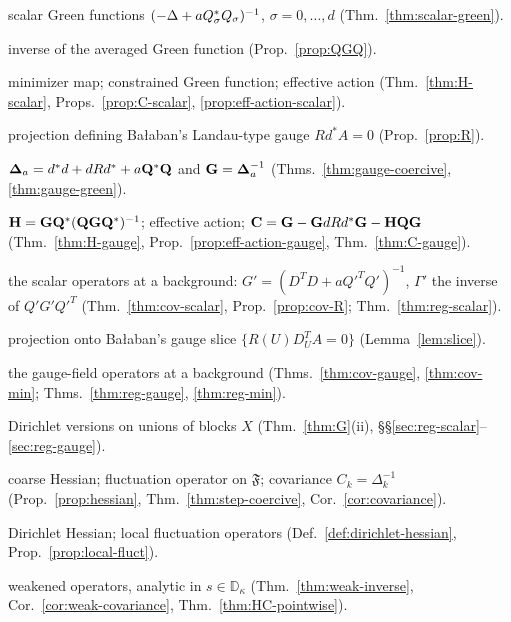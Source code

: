 {\small
\begin{description}[font=\normalfont,style=nextline,leftmargin=10em,labelwidth=9.5em,labelsep=0.5em,itemsep=1pt,parsep=0pt,topsep=4pt]
\item[$G_\sigma$] scalar Green functions $(-\Delta+aQ_\sigma^*Q_\sigma)^{-1}$, $\sigma=0,\dots,d$ (Thm.~\ref{thm:scalar-green}).
\item[$(Q_\sigma G_\sigma Q_\sigma^*)^{-1}$] inverse of the averaged Green function (Prop.~\ref{prop:QGQ}).
\item[$H_\sigma$, $C_\sigma$, $\cD_\sigma$] minimizer map; constrained Green function; effective action (Thm.~\ref{thm:H-scalar}, Props.~\ref{prop:C-scalar}, \ref{prop:eff-action-scalar}).
\item[$R=I-P_\cV$] projection defining Ba\l aban's Landau-type gauge $Rd^*A=0$ (Prop.~\ref{prop:R}).
\item[$\bL_a$, $\bG$] $\boldsymbol{\Delta}_a=d^*d+dRd^*+a\mathbf Q^*\mathbf Q$ and $\mathbf G=\boldsymbol{\Delta}_a^{-1}$ (Thms.~\ref{thm:gauge-coercive}, \ref{thm:gauge-green}).
\item[$\bH$, $\bD$, $\bC$] $\mathbf H=\mathbf G\mathbf Q^*(\mathbf Q\mathbf G\mathbf Q^*)^{-1}$; effective action; $\mathbf C=\mathbf G-\mathbf G dRd^*\mathbf G-\mathbf H\mathbf Q\mathbf G$ (Thm.~\ref{thm:H-gauge}, Prop.~\ref{prop:eff-action-gauge}, Thm.~\ref{thm:C-gauge}).
\item[$G'(U)$, $\Gamma'(U)$, $H'(U)$, $C'(U)$, $R(U)$] the scalar operators at a background: $G'=(D^TD+aQ'^TQ')^{-1}$, $\Gamma'$ the inverse of $Q'G'Q'^T$ (Thm.~\ref{thm:cov-scalar}, Prop.~\ref{prop:cov-R}; Thm.~\ref{thm:reg-scalar}).
\item[$\Pi(U)$] projection onto Ba\l aban's gauge slice $\{R(U)D_U^TA=0\}$ (Lemma~\ref{lem:slice}).
\item[$\bG(U)$, $\bH(U)$, $\bC(U)$] the gauge-field operators at a background (Thms.~\ref{thm:cov-gauge}, \ref{thm:cov-min}; Thms.~\ref{thm:reg-gauge}, \ref{thm:reg-min}).
\item[$G'_X$, $\bG^X$, \dots] Dirichlet versions on unions of blocks $X$ (Thm.~\ref{thm:G}(ii), \S\S\ref{sec:reg-scalar}--\ref{sec:reg-gauge}).
\item[$\Delta^0$, $\Delta_k$, $C_k$] coarse Hessian; fluctuation operator on $\mathfrak F$; covariance $C_k=\Delta_k^{-1}$ (Prop.~\ref{prop:hessian}, Thm.~\ref{thm:step-coercive}, Cor.~\ref{cor:covariance}).
\item[$\Delta^{0,X}$, $\Delta_Y$] Dirichlet Hessian; local fluctuation operators (Def.~\ref{def:dirichlet-hessian}, Prop.~\ref{prop:local-fluct}).
\item[$\bG(s)$, $\bH(s)$, $\bC(s)$, $C_k^{1/2}(s)$] weakened operators, analytic in $s\in\mathbb D_\kappa$ (Thm.~\ref{thm:weak-inverse}, Cor.~\ref{cor:weak-covariance}, Thm.~\ref{thm:HC-pointwise}).

\end{description}}
